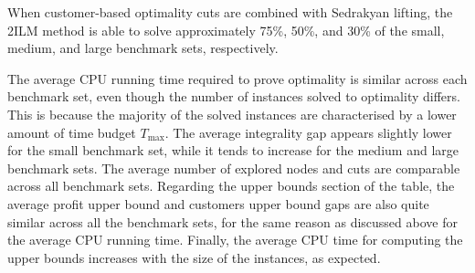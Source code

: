 \documentclass[11pt]{article}
\theoremstyle{definition}
\begin{document}
When customer-based optimality cuts are combined with Sedrakyan lifting, the 2ILM method is able to solve approximately 75\%, 50\%, and 30\% of the small, medium, and large benchmark sets, respectively.

The average CPU running time required to prove optimality is similar across each benchmark set, even though the number of instances solved to optimality differs. This is because the majority of the solved instances are characterised by a lower amount of time budget $T_{\max}$. The average integrality gap appears slightly lower for the small benchmark set, while it tends to increase for the medium and large benchmark sets. The average number of explored nodes and cuts are comparable across all benchmark sets. Regarding the upper bounds section of the table, the average profit upper bound and customers upper bound gaps are also quite similar across all the benchmark sets, for the same reason as discussed above for the average CPU running time. Finally, the average CPU time for computing the upper bounds increases with the size of the instances, as expected.
\end{document}
